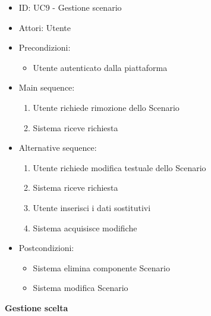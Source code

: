 \documentclass{article}
\begin{document}
\begin{itemize}[label = { }]
    \itemsep0px
    \item ID: UC9 - Gestione scenario
    \item Attori: Utente
    \item Precondizioni: 
        \begin{itemize}[label = {-}]
            \item Utente autenticato dalla piattaforma
        \end{itemize}
    \item Main sequence: 
        \begin{enumerate}
            \item Utente richiede rimozione dello Scenario
            \item Sistema riceve richiesta
        \end{enumerate}
    \item Alternative sequence:
        \begin{enumerate}
            \item Utente richiede modifica testuale dello Scenario
            \item Sistema riceve richiesta
            \item Utente inserisci i dati sostitutivi
            \item Sistema acquisisce modifiche
        \end{enumerate}
    \item Postcondizioni: 
        \begin{itemize}[label = {-}]
            \item Sistema elimina componente Scenario
            \item Sistema modifica Scenario
        \end{itemize}
\end{itemize}
\textbf{Gestione scelta}
\end{document}
